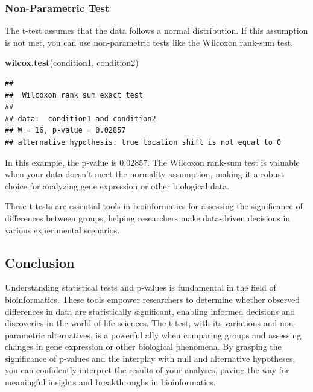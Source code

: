 \documentclass[
]{book}
\newenvironment{Shaded}{\begin{snugshade}}{\end{snugshade}}
\newcommand{\FunctionTok}[1]{\textcolor[rgb]{0.13,0.29,0.53}{\textbf{#1}}}
\newcommand{\NormalTok}[1]{#1}
\begin{document}
\hypertarget{non-parametric-test}{%
\subsubsection{Non-Parametric Test}\label{non-parametric-test}}

The t-test assumes that the data follows a normal distribution. If this assumption is not met, you can use non-parametric tests like the Wilcoxon rank-sum test.

\begin{Shaded}
\begin{Highlighting}[]
\FunctionTok{wilcox.test}\NormalTok{(condition1, condition2)}
\end{Highlighting}
\end{Shaded}

\begin{verbatim}
## 
##  Wilcoxon rank sum exact test
## 
## data:  condition1 and condition2
## W = 16, p-value = 0.02857
## alternative hypothesis: true location shift is not equal to 0
\end{verbatim}

In this example, the p-value is 0.02857. The Wilcoxon rank-sum test is valuable when your data doesn't meet the normality assumption, making it a robust choice for analyzing gene expression or other biological data.

These t-tests are essential tools in bioinformatics for assessing the significance of differences between groups, helping researchers make data-driven decisions in various experimental scenarios.

\hypertarget{conclusion-10}{%
\subsection{Conclusion}\label{conclusion-10}}

Understanding statistical tests and p-values is fundamental in the field of bioinformatics. These tools empower researchers to determine whether observed differences in data are statistically significant, enabling informed decisions and discoveries in the world of life sciences. The t-test, with its variations and non-parametric alternatives, is a powerful ally when comparing groups and assessing changes in gene expression or other biological phenomena. By grasping the significance of p-values and the interplay with null and alternative hypotheses, you can confidently interpret the results of your analyses, paving the way for meaningful insights and breakthroughs in bioinformatics.
\end{document}

